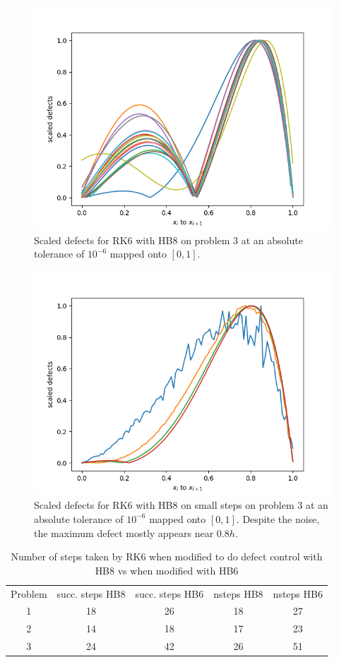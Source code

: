 \begin{figure}[H]
\centering
\includegraphics[width=0.7\linewidth]{./figures/rk6_with_hb8_p3_scaled_defects}
\caption{Scaled defects for RK6 with HB8 on problem 3 at an absolute tolerance of $10^{-6}$ mapped onto $[0, 1]$.}
\label{fig:rk6_with_hb8_p3_scaled_defects}
\end{figure}

\begin{figure}[H]
\centering
\includegraphics[width=0.7\linewidth]{./figures/rk6_with_hb8_p3_scaled_defects_small_steps}
\caption{Scaled defects for RK6 with HB8 on small steps on problem 3 at an absolute tolerance of $10^{-6}$ mapped onto $[0, 1]$. Despite the noise, the maximum defect mostly appears near $0.8h$.}
\label{fig:rk6_with_hb8_p3_scaled_defects_small_steps}
\end{figure}

\begin{table}[h]
\caption {Number of steps taken by RK6 when modified to do defect control with HB8 vs when modified with HB6} \label{tab:rk6_with_hb6_vs_hb8_nsteps}
\begin{center}
\begin{tabular}{ c c c c c } 
Problem & succ. steps HB8 & succ. steps HB6 & nsteps HB8 & nsteps HB6 \\ 
1       & 18                 &        26          & 18         & 27\\ 
2       & 14                 &        18          & 17         & 23\\
3       & 24                 &        42          & 26         & 51\\
\end{tabular}
\end{center}
\end{table}

